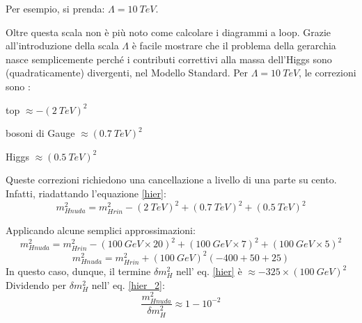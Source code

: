 \medskip
Per esempio, si prenda: $\Lambda=10 ~TeV$.

\medskip
Oltre questa scala non è più noto come calcolare i diagrammi a loop.
\newline
Grazie all'introduzione della scala $\Lambda$ è facile mostrare che il problema della gerarchia nasce
semplicemente perché i contributi correttivi alla massa dell'Higgs sono (quadraticamente) divergenti, nel Modello Standard.
Per $\Lambda=10 ~TeV$, le correzioni sono \cite{higgs_corr}:

\begin{center}
 top $\approx -(2 ~TeV)^{2}$

 bosoni di Gauge $\approx (0.7 ~TeV)^{2}$

Higgs $\approx (0.5 ~TeV)^{2}$
\end{center}

Queste correzioni richiedono una cancellazione a livello di una parte su cento.
Infatti, riadattando l'equazione \ref{hier}:
\begin{equation}
 m^{2}_{Hnuda}=m^{2}_{Hrin}-(2 ~TeV)^{2}+(0.7 ~TeV)^{2}+(0.5 ~TeV)^{2}
\end{equation}

\medskip
Applicando alcune semplici approssimazioni:
\begin{equation}
 m^{2}_{Hnuda}=m^{2}_{Hrin} -(100 ~GeV\times20)^{2}+(100 ~GeV\times7)^{2}+(100 ~GeV\times5)^{2}
\end{equation}
\begin{equation}
\label{hier_2}
 m^{2}_{Hnuda}=m^{2}_{Hrin} +(100 ~GeV)^{2}(-400+50+25)
\end{equation}
In questo caso, dunque, il termine $\delta m^{2}_{H}$ nell' eq. \ref{hier} è $\approx -325\times(100 ~GeV)^{2}$
\newline
Dividendo per $\delta m^{2}_{H}$ nell' eq. \ref{hier_2}:
\begin{equation}
\label{hier_3}
 \dfrac{m^{2}_{Hnuda}}{\delta m^{2}_{H}}\approx 1-10^{-2}
\end{equation}

